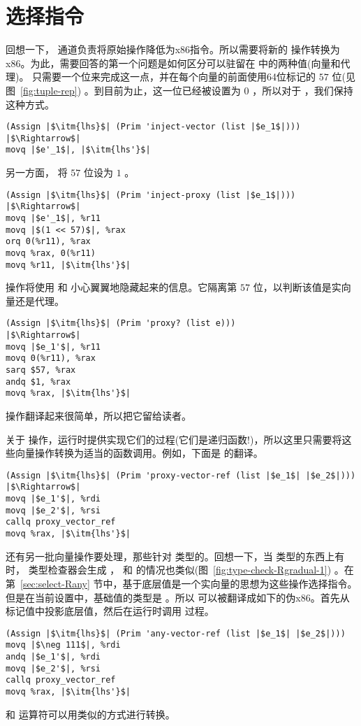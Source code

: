 \documentclass[11pt]{book}
\begin{document}
\section{选择指令}
\label{sec:select-instructions-gradual}

回想一下，  通道负责将原始操作降低为x86指令。所以需要将新的  操作转换为x86。为此，需要回答的第一个问题是如何区分可以驻留在  中的两种值(向量和代理)。
只需要一个位来完成这一点，并在每个向量的前面使用64位标记的
$57$ 位(见图~\ref{fig:tuple-rep}) 。到目前为止，这一位已经被设置为 $0$ ，所以对于  ，我们保持这种方式。
\begin{lstlisting}
(Assign |$\itm{lhs}$| (Prim 'inject-vector (list |$e_1$|)))
|$\Rightarrow$|  
movq |$e'_1$|, |$\itm{lhs'}$|
\end{lstlisting}
另一方面，  将 $57$ 位设为 $1$ 。
\begin{lstlisting}
(Assign |$\itm{lhs}$| (Prim 'inject-proxy (list |$e_1$|)))
|$\Rightarrow$|  
movq |$e'_1$|, %r11
movq |$(1 << 57)$|, %rax
orq 0(%r11), %rax
movq %rax, 0(%r11)
movq %r11, |$\itm{lhs'}$|
\end{lstlisting}

  操作将使用  和  小心翼翼地隐藏起来的信息。它隔离第 $57$ 位，以判断该值是实向量还是代理。
\begin{lstlisting}
(Assign |$\itm{lhs}$| (Prim 'proxy? (list e)))
|$\Rightarrow$|
movq |$e_1'$|, %r11
movq 0(%r11), %rax
sarq $57, %rax
andq $1, %rax
movq %rax, |$\itm{lhs'}$|
\end{lstlisting}

  操作翻译起来很简单，所以把它留给读者。

关于  操作，运行时提供实现它们的过程(它们是递归函数!)，所以这里只需要将这些向量操作转换为适当的函数调用。例如，下面是
 的翻译。
\begin{lstlisting}
(Assign |$\itm{lhs}$| (Prim 'proxy-vector-ref (list |$e_1$| |$e_2$|)))
|$\Rightarrow$|
movq |$e_1'$|, %rdi
movq |$e_2'$|, %rsi
callq proxy_vector_ref
movq %rax, |$\itm{lhs'}$|
\end{lstlisting}

还有另一批向量操作要处理，那些针对
 类型的。回想一下，当 类型的东西上有  时， \LangGrad{} 类型检查器会生成
 ，   和
 的情况也类似(图~\ref{fig:type-check-Rgradual-1}) 。在第~\ref{sec:select-Rany} 节中，基于底层值是一个实向量的思想为这些操作选择指令。但是在当前设置中，基础值的类型是
 。所以  可以被翻译成如下的伪x86。首先从标记值中投影底层值，然后在运行时调用 
过程。
\begin{lstlisting}
(Assign |$\itm{lhs}$| (Prim 'any-vector-ref (list |$e_1$| |$e_2$|)))
movq |$\neg 111$|, %rdi
andq |$e_1'$|, %rdi
movq |$e_2'$|, %rsi
callq proxy_vector_ref
movq %rax, |$\itm{lhs'}$|
\end{lstlisting}
  和  运算符可以用类似的方式进行转换。
\end{document}
